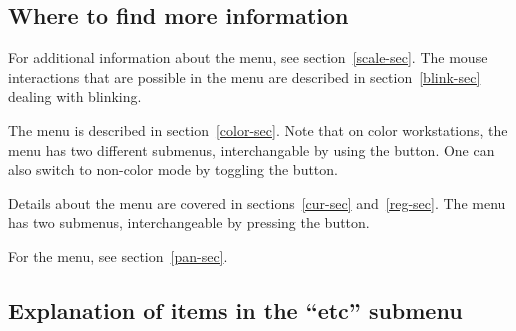 \subsection{ Where to find more information }

For additional information about the  menu, see
section~\ref{scale-sec}.  The mouse interactions that are possible in
the  menu are described in section~\ref{blink-sec} dealing
with blinking.

The  menu is described in section~\ref{color-sec}.
Note that on color workstations, the  menu has two different
submenus, interchangable by using the  button.
One can also switch to non-color mode by toggling the  button.

Details about the  menu are covered in sections~\ref{cur-sec}
and~\ref{reg-sec}.  The  menu has two submenus,
interchangeable by pressing the  button.

For the  menu, see section~\ref{pan-sec}.

\subsection{ Explanation of items in the ``etc'' submenu } \label{etc-sec}

